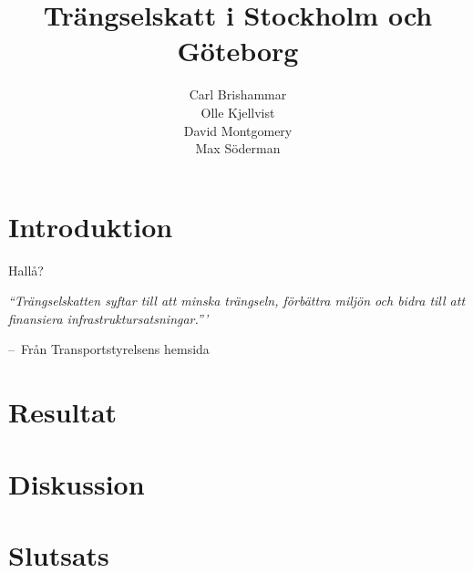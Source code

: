 \documentclass{amsart}
\title{Trängselskatt i Stockholm och Göteborg}
\author{Carl Brishammar \\ Olle Kjellvist \\ David Montgomery \\ Max Söderman}
\date{}
\makeatletter
\newenvironment{chapquote}[2][2em]
  {\setlength{\@tempdima}{#1}%
   \def\chapquote@author{#2}%
   \parshape 1 \@tempdima \dimexpr\textwidth-2\@tempdima\relax%
   \itshape}
  {\par\normalfont\hfill--\ \chapquote@author\hspace*{\@tempdima}\par\bigskip}
\makeatother
\begin{document}
\begin{abstract}
\end{abstract}
\maketitle
\newpage
\tableofcontents
\newpage
\section{Introduktion}


Hallå?

\begin{chapquote}{Från Transportstyrelsens hemsida}
``Trängselskatten syftar till att minska trängseln, förbättra miljön och bidra till att finansiera infrastruktursatsningar.”'
\end{chapquote}

\section{Resultat}

\section{Diskussion}

\section{Slutsats}

\newpage
\printbibliography
\end{document}
